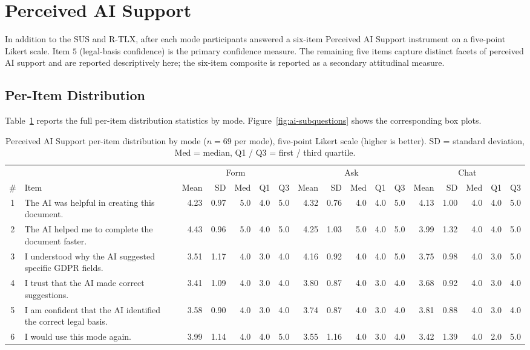 \section{Perceived AI Support}
\label{sec:eval-ai-support}

In addition to the SUS and R-TLX, after each mode participants answered a
six-item Perceived AI Support instrument on a five-point Likert scale. Item
$5$ (legal-basis confidence) is the primary confidence measure. The remaining
five items capture distinct facets of perceived AI support and are reported
descriptively here; the six-item composite is reported as a secondary
attitudinal measure.

\subsection{Per-Item Distribution}

Table~\ref{tab:ai-per-item-full} reports the full per-item distribution
statistics by mode. Figure~\ref{fig:ai-subquestions} shows the corresponding
box plots.

\begin{table}[htbp]
\centering
\caption{Perceived AI Support per-item distribution by mode ($n = 69$ per
mode), five-point Likert scale (higher is better). SD = standard deviation,
Med = median, Q1 / Q3 = first / third quartile.}
\label{tab:ai-per-item-full}
\scriptsize
\begin{tabularx}{\linewidth}{@{}c X r r r r r r r r r r r r r r r@{}}
\toprule
& & \multicolumn{5}{c}{Form} & \multicolumn{5}{c}{Ask} & \multicolumn{5}{c}{Chat} \\
\cmidrule(lr){3-7}\cmidrule(lr){8-12}\cmidrule(lr){13-17}
\# & Item & Mean & SD & Med & Q1 & Q3 & Mean & SD & Med & Q1 & Q3 & Mean & SD & Med & Q1 & Q3 \\
\midrule
1 & The AI was helpful in creating this document.                  & 4.23 & 0.97 & 5.0 & 4.0 & 5.0 & 4.32 & 0.76 & 4.0 & 4.0 & 5.0 & 4.13 & 1.00 & 4.0 & 4.0 & 5.0 \\
2 & The AI helped me to complete the document faster.              & 4.43 & 0.96 & 5.0 & 4.0 & 5.0 & 4.25 & 1.03 & 5.0 & 4.0 & 5.0 & 3.99 & 1.32 & 4.0 & 4.0 & 5.0 \\
3 & I understood why the AI suggested specific GDPR fields.        & 3.51 & 1.17 & 4.0 & 3.0 & 4.0 & 4.16 & 0.92 & 4.0 & 4.0 & 5.0 & 3.75 & 0.98 & 4.0 & 3.0 & 5.0 \\
4 & I trust that the AI made correct suggestions.                  & 3.41 & 1.09 & 4.0 & 3.0 & 4.0 & 3.80 & 0.87 & 4.0 & 3.0 & 4.0 & 3.68 & 0.92 & 4.0 & 3.0 & 4.0 \\
5 & I am confident that the AI identified the correct legal basis. & 3.58 & 0.90 & 4.0 & 3.0 & 4.0 & 3.74 & 0.87 & 4.0 & 3.0 & 4.0 & 3.81 & 0.88 & 4.0 & 3.0 & 4.0 \\
6 & I would use this mode again.                                   & 3.99 & 1.14 & 4.0 & 4.0 & 5.0 & 3.55 & 1.16 & 4.0 & 3.0 & 4.0 & 3.42 & 1.39 & 4.0 & 2.0 & 5.0 \\
\bottomrule
\end{tabularx}
\end{table}

